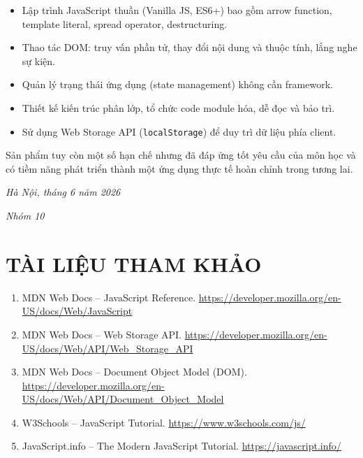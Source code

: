 \documentclass[12pt,a4paper]{article}
\begin{document}
\begin{itemize}[leftmargin=2cm]
  \item Lập trình JavaScript thuần (Vanilla JS, ES6+) bao gồm arrow function, template literal, spread operator, destructuring.
  \item Thao tác DOM: truy vấn phần tử, thay đổi nội dung và thuộc tính, lắng nghe sự kiện.
  \item Quản lý trạng thái ứng dụng (state management) không cần framework.
  \item Thiết kế kiến trúc phân lớp, tổ chức code module hóa, dễ đọc và bảo trì.
  \item Sử dụng Web Storage API (\texttt{localStorage}) để duy trì dữ liệu phía client.
\end{itemize}

Sản phẩm tuy còn một số hạn chế nhưng đã đáp ứng tốt yêu cầu của môn học và có tiềm năng phát triển thành một ứng dụng thực tế hoàn chỉnh trong tương lai.

\bigskip
\hfill\textit{Hà Nội, tháng 6 năm 2026}

\hfill\textit{Nhóm 10}

\newpage
\section*{TÀI LIỆU THAM KHẢO}

\begin{enumerate}[leftmargin=2cm]
  \item MDN Web Docs -- JavaScript Reference. \url{https://developer.mozilla.org/en-US/docs/Web/JavaScript}
  \item MDN Web Docs -- Web Storage API. \url{https://developer.mozilla.org/en-US/docs/Web/API/Web_Storage_API}
  \item MDN Web Docs -- Document Object Model (DOM). \url{https://developer.mozilla.org/en-US/docs/Web/API/Document_Object_Model}
  \item W3Schools -- JavaScript Tutorial. \url{https://www.w3schools.com/js/}
  \item JavaScript.info -- The Modern JavaScript Tutorial. \url{https://javascript.info/}
\end{enumerate}

\newpage
\appendix
\end{document}
